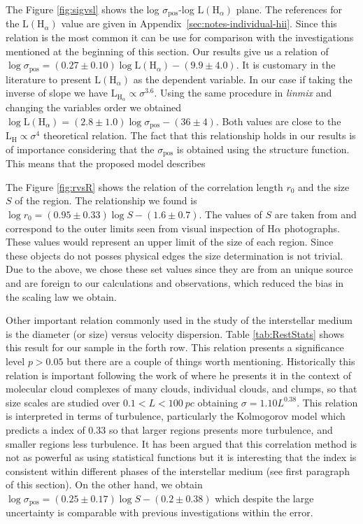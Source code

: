 \documentclass[fleqn,usenatbib, useAMS, a4paper]{mnras}
\newcommand\pos{\ensuremath{_{\mathrm{pos}}}}
\newcommand\ha{\ensuremath{\text{H}\alpha}}
\begin{document}
The Figure \ref{fig:sigvsl} shows the log \(\sigma\pos\)-log \(\text{L}(\text{H}_{\alpha})\) plane.
The references for the \(\text{L}(\text{H}_{\alpha})\) value are given in Appendix~\ref{sec:notes-individual-hii}.
Since this relation is the most common it can be use for comparison with the investigations mentioned at the beginning of this section.
Our results give us a relation of \(\log \sigma\pos = (0.27 \pm 0.10) \log \text{L}(\text{H}_{\alpha})-(9.9 \pm 4.0)\).
It is customary in the literature to present \(\text{L} (\text{H}_{\alpha})\) as the dependent variable.
In our case if taking the inverse of slope we have \(\text{L}_{\text{H}_{\alpha}} \propto \sigma^{3.6}\). 
Using the same procedure in \textit{linmix} and changing the variables order we obtained \(\log \text{L}(\text{H}_{\alpha}) = (2.8\pm 1.0) \log \sigma\pos -(36 \pm 4)\).
Both values are close to the \(\text{L}_{\text{H}} \propto \sigma^{4}\) theoretical relation.
The fact that this relationship holds in our results is of importance considering that the \(\sigma\pos\) is obtained using the structure function.
This means that the proposed model describes


The Figure \ref{fig:rvsR} shows the relation of the correlation length \(r_0\) and the size \(S\) of the region. 
The relationship we found is \(\log r_0 = (0.95 \pm 0.33) \log S - (1.6 \pm 0.7)\).
The values of \(S\) are taken from \citet{1984ApJ...287..116K} and correspond to the outer
limits seen from visual inspection of \ha{} photographs.
These values would represent an upper limit of the size of each region.
Since these objects do not posses physical edges the size determination is not trivial.
Due to the above, we chose these set values since they are from an unique source and are foreign to our calculations and observations, which reduced the bias in the scaling law we obtain.  

Other important relation commonly used in the study of the interstellar medium is the diameter (or size) versus velocity dispersion.
Table \ref{tab:RestStats} shows this result for our sample in the forth row. 
This relation presents a significance level \(p > \num{0.05}\) but there are a couple of things worth mentioning.
Historically this relation is important following the work of \citet{1981MNRAS.194..809L} where he presents it in the context of molecular cloud complexes of many clouds, individual clouds, and clumps, so that size scales are studied over \(\num{0.1} < L < \SI{100}{pc}\) obtaining \(\sigma = 1.10 L ^{0.38}\). 
This relation is interpreted in terms of turbulence, particularly the Kolmogorov model which predicts a index of \num{0.33} so that larger regions presents more turbulence, and smaller regions less turbulence.
It has been argued that this correlation method is not as powerful as using statistical functions \citep{1984ApJ...277..556S} but it is interesting that the index is consistent within different phases of the interstellar medium (see first paragraph of this section).
On the other hand, we obtain \(\log \sigma\pos = (0.25 \pm 0.17) \log S - (0.2 \pm 0.38)\) which despite the large uncertainty is comparable with previous investigations within the error.
\end{document}

